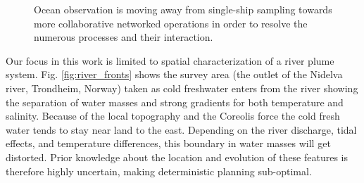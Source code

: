 \documentclass[aoas]{imsart}
\begin{document}
\begin{figure}[!h] 
  \centering 
  \hfill
  \caption{Ocean observation is moving away from single-ship sampling
    towards more collaborative networked operations in order to resolve
    the numerous processes and their interaction.} \label{fig:envir}
\end{figure}

Our focus in this work is limited to spatial characterization of a river
plume system. Fig. \ref{fig:river_fronts} shows the survey area (the
outlet of the Nidelva river, Trondheim, Norway) taken as cold freshwater
enters from the river showing the separation of water masses and strong
gradients for both temperature and salinity. Because of the local
topography and the Coreolis force \citep{coriolis1835memoire} the cold
fresh water tends to stay near land to the east. Depending on the river
discharge, tidal effects, and temperature differences, this boundary in
water masses will get distorted. Prior knowledge about the location and
evolution of these features is therefore highly uncertain, making
deterministic planning sub-optimal.%
\end{document}
